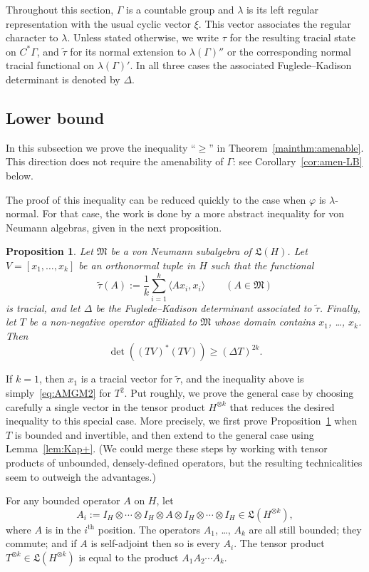 \documentclass[12pt,a4paper]{article}
\numberwithin{equation}{section}
\newtheorem{prop}[thm]{Proposition}
\theoremstyle{remark}
\renewcommand{\rm}[1]{\mathrm{#1}}
\newcommand{\frL}{\mathfrak{L}}
\newcommand{\M}{\mathfrak{M}}
\newcommand{\G}{\Gamma}
\renewcommand{\phi}{\varphi}
\renewcommand{\l}{\lambda}
\renewcommand{\t}[1]{\widetilde{#1}}
\begin{document}
Throughout this section, $\G$ is a countable group and $\l$ is its left regular representation with the usual cyclic vector $\xi$.  This vector associates the regular character to $\l$.  Unless stated otherwise, we write $\tau$ for the resulting tracial state on $C^\ast \G$, and $\t{\tau}$ for its normal extension to $\l(\G)''$ or the corresponding normal tracial functional on $\l(\G)'$.  In all three cases the associated Fuglede--Kadison determinant is denoted by $\Delta$.




\subsection{Lower bound}\label{subs:amen-LB}

In this subsection we prove the inequality ``$\ge$'' in Theorem~\ref{mainthm:amenable}.  This direction does not require the amenability of $\G$: see Corollary~\ref{cor:amen-LB} below.

The proof of this inequality can be reduced quickly to the case when $\phi$ is $\l$-normal.  For that case, the work is done by a more abstract inequality for von Neumann algebras, given in the next proposition.

\begin{prop}\label{prop:amen-LB}
Let $\M$ be a von Neumann subalgebra of $\frL(H)$.  Let $V = [x_1,\dots,x_k]$ be an orthonormal tuple in $H$ such that the functional
\[\t{\tau}(A) := \frac{1}{k}\sum_{i=1}^k\langle Ax_i,x_i\rangle \qquad (A \in \M)\]
is tracial, and let $\Delta$ be the Fuglede--Kadison determinant associated to $\t{\tau}$.  Finally, let $T$ be a non-negative operator affiliated to $\M$ whose domain contains $x_1$, \dots, $x_k$.  Then
\[\det((TV)^\ast (TV)) \ge (\Delta T)^{2k}.\]
\end{prop}

If $k=1$, then $x_1$ is a tracial vector for $\t{\tau}$, and the inequality above is simply~\eqref{eq:AMGM2} for $T^2$.  Put roughly, we prove the general case by choosing carefully a single vector in the tensor product $H^{\otimes k}$ that reduces the desired inequality to this special case.  More precisely, we first prove Proposition~\ref{prop:amen-LB} when $T$ is bounded and invertible, and then extend to the general case using Lemma~\ref{lem:Kap+}.  (We could merge these steps by working with tensor products of unbounded, densely-defined operators, but the resulting technicalities seem to outweigh the advantages.)

For any bounded operator $A$ on $H$, let
\[A_i := I_H\otimes \cdots \otimes I_H\otimes A\otimes I_H\otimes \cdots \otimes I_H \in \frL(H^{\otimes k}),\]
where $A$ is in the $i^\rm{th}$ position.  The operators $A_1$, \dots, $A_k$ are all still bounded; they commute; and if $A$ is self-adjoint then so is every $A_i$.  The tensor product $T^{\otimes k} \in \frL(H^{\otimes k})$ is equal to the product $A_1A_2\cdots A_k$.
\end{document}
